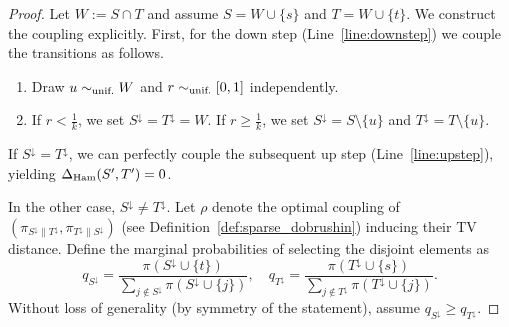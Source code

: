 \documentclass[11pt]{article}
\newcommand{\defeq}{:=}
\newcommand{\1}{\mathbf{1}}
\newcommand{\0}{\mathbf{0}}
\newcommand{\dham}{\Delta_{\textup{Ham}}}
\newcommand{\simu}{\sim_{\textup{unif.}}}
\begin{document}
\begin{proof}
Let $W \defeq S \cap T$ and assume $S = W \cup \{s\}$ and $T = W \cup \{t\}$. We construct the coupling explicitly. First, for the down step (Line~\ref{line:downstep}) we couple the transitions as follows.
\begin{enumerate}
    \item Draw $u \simu W$ and $r \simu [0, 1]$ independently.
    \item If $r < \frac{1}{k}$, we set $S^\downarrow = T^\downarrow = W$. If $r \ge \frac{1}{k}$, we set $S^\downarrow = S \setminus \{u\}$ and $T^\downarrow = T \setminus \{u\}$.
\end{enumerate}
If $S^\downarrow = T^\downarrow$, we can perfectly couple the subsequent up step (Line~\ref{line:upstep}), yielding $\dham(S', T') = 0$.

In the other case, $S^\downarrow \neq T^\downarrow$. Let $\rho$ denote the optimal coupling of $(\pi_{S^\downarrow \| T^\downarrow}, \pi_{T^\downarrow \| S^\downarrow})$ (see Definition~\ref{def:sparse_dobrushin}) inducing their TV distance. Define the marginal probabilities of selecting the disjoint elements as 
\[q_{S^\downarrow} = \frac{\pi(S^\downarrow \cup \{t\})}{\sum_{j \notin S^\downarrow} \pi(S^\downarrow \cup \{j\})},\quad q_{T^\downarrow} = \frac{\pi(T^\downarrow \cup \{s\})}{\sum_{j \notin T^\downarrow} \pi(T^\downarrow \cup \{j\})}.\]
Without loss of generality (by symmetry of the statement), assume $q_{S^\downarrow} \ge q_{T^\downarrow}$. 


\end{proof}
\end{document}
